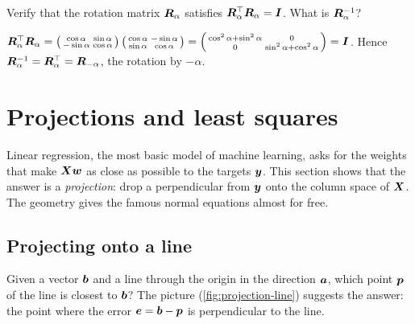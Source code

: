 \begin{exercise}
Verify that the rotation matrix $\bm{R}_\alpha$ satisfies
$\bm{R}_\alpha^\top\bm{R}_\alpha = \bm{I}$. What is $\bm{R}_\alpha^{-1}$?
\end{exercise}
\begin{solution}
$\bm{R}_\alpha^\top\bm{R}_\alpha = \left(\begin{smallmatrix} \cos\alpha & \sin\alpha\\
-\sin\alpha & \cos\alpha\end{smallmatrix}\right)\left(\begin{smallmatrix}
\cos\alpha & -\sin\alpha\\ \sin\alpha & \cos\alpha\end{smallmatrix}\right) =
\left(\begin{smallmatrix} \cos^2\alpha + \sin^2\alpha & 0\\ 0 & \sin^2\alpha +
\cos^2\alpha\end{smallmatrix}\right) = \bm{I}$. Hence
$\bm{R}_\alpha^{-1} = \bm{R}_\alpha^\top = \bm{R}_{-\alpha}$, the rotation by $-\alpha$.
\end{solution}

\section{Projections and least squares}\label{sec:projections}

\begin{motivation}
Linear regression, the most basic model of machine learning, asks for the
weights that make $\bm{X}\bm{w}$ as close as possible to the targets $\bm{y}$. This
section shows that the answer is a \emph{projection}: drop a perpendicular
from $\bm{y}$ onto the column space of $\bm{X}$. The geometry gives the famous
normal equations almost for free.
\end{motivation}

\subsection{Projecting onto a line}

Given a vector $\bm{b}$ and a line through the origin in the direction $\bm{a}$, which
point $\bm{p}$ of the line is closest to $\bm{b}$? The picture
(\cref{fig:projection-line}) suggests the answer: the point where the error
$\bm{e} = \bm{b} - \bm{p}$ is perpendicular to the line.

